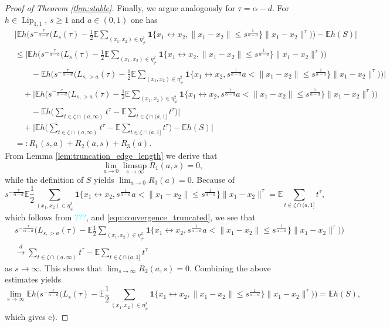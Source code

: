\documentclass{article}
\theoremstyle{definition}
\numberwithin{equation}{section}
\theoremstyle{remark}
\begin{document}
\begin{proof}[Proof of Theorem \ref{thm:stable}]
Finally, we argue analogously for $\tau=\alpha-d$. For $h\in\operatorname{Lip}_{1,1}$, $s\geq 1$ and $a\in(0,1)$ one has
\begin{align*}
& \bigg| \mathbb{E} h\bigg(s^{-\frac{\tau}{\alpha-d}}\bigg(L_s(\tau)-\frac{1}{2}\mathbb{E}\sum_{(x_1,x_2)\in\eta^2_{\neq}} \mathbf{1}\{x_1\leftrightarrow x_2, \|x_1-x_2\|\leq s^{\frac{1}{\alpha-d}}\} \|x_1-x_2\|^\tau\bigg)\bigg)  - \mathbb{E} h(S)\bigg| \\
& \leq \bigg| \mathbb{E} h\bigg(s^{-\frac{\tau}{\alpha-d}}\bigg(L_s(\tau)-\frac{1}{2}\mathbb{E}\sum_{(x_1,x_2)\in\eta^2_{\neq}} \mathbf{1}\{x_1\leftrightarrow x_2, \|x_1-x_2\|\leq s^{\frac{1}{\alpha-d}}\} \|x_1-x_2\|^\tau\bigg)\bigg) \\
& \quad \quad - \mathbb{E} h\bigg(s^{-\frac{\tau}{\alpha-d}}\bigg(L_{s,>a}(\tau)-\frac{1}{2}\mathbb{E}\sum_{(x_1,x_2)\in\eta^2_{\neq}} \mathbf{1}\{x_1\leftrightarrow x_2, s^{\frac{1}{\alpha-d}}a<\|x_1-x_2\|\leq s^{\frac{1}{\alpha-d}}\} \|x_1-x_2\|^\tau\bigg)\bigg) \bigg| \\
& \quad + \bigg| \mathbb{E} h\bigg(s^{-\frac{\tau}{\alpha-d}}\bigg(L_{s,>a}(\tau)-\frac{1}{2}\mathbb{E}\sum_{(x_1,x_2)\in\eta^2_{\neq}} \mathbf{1}\{x_1\leftrightarrow x_2, s^{\frac{1}{\alpha-d}}a<\|x_1-x_2\|\leq s^{\frac{1}{\alpha-d}}\} \|x_1-x_2\|^\tau\bigg)\bigg) \\
& \quad \quad - \mathbb{E} h\bigg( \sum_{t\in \zeta\cap(a,\infty)} t^\tau - \mathbb{E} \sum_{t\in \zeta\cap(a,1]} t^\tau \bigg)\bigg| \\
& \quad + \bigg| \mathbb{E} h\bigg( \sum_{t\in \zeta\cap(a,\infty)} t^\tau - \mathbb{E} \sum_{t\in \zeta\cap(a,1]} t^\tau \bigg) -\mathbb{E}h(S) \bigg| \\
& =: R_1(s,a) + R_2(a,s) + R_3(a).
\end{align*}
From Lemma \ref{lem:truncation_edge_length} we derive that
$$
\lim_{a\to 0} \limsup_{s\to\infty} R_1(a,s) = 0,
$$
while the definition of $S$ yields $\lim_{a\to0} R_3(a)=0$. Because of
$$
s^{-\frac{\tau}{\alpha-d}}\mathbb{E}\frac{1}{2}\sum_{(x_1,x_2)\in\eta^2_{\neq}} \mathbf{1}\{x_1\leftrightarrow x_2,s^{\frac{1}{\alpha-d}}a<\|x_1-x_2\|\leq s^{\frac{1}{\alpha-d}}\} \|x_1-x_2\|^\tau = \mathbb{E} \sum_{t\in \zeta\cap(a,1]} t^\tau,
$$
which follows from \textcolor{cyan}{???}, and \eqref{eqn:convergence_truncated}, we see that
\begin{align*}
& s^{-\frac{\tau}{\alpha-d}}\bigg(L_{s,>a}(\tau)-\mathbb{E}\frac{1}{2}\sum_{(x_1,x_2)\in\eta^2_{\neq}} \mathbf{1}\{x_1\leftrightarrow x_2, s^{\frac{1}{\alpha-d}}a<\|x_1-x_2\|\leq s^{\frac{1}{\alpha-d}}\} \|x_1-x_2\|^\tau\bigg)\bigg) \\
& \overset{d}{\longrightarrow} \sum_{t\in \zeta\cap(a,\infty)} t^\tau - \mathbb{E} \sum_{t\in \zeta\cap(a,1]} t^\tau
\end{align*}
as $s\to\infty$. This shows that $\lim_{s\to\infty} R_2(a,s)=0$. Combining the above estimates yields
$$
\lim_{s\to\infty} \mathbb{E} h\bigg(s^{-\frac{\tau}{\alpha-d}}\bigg(L_s(\tau)-\mathbb{E}\frac{1}{2}\sum_{(x_1,x_2)\in\eta^2_{\neq}} \mathbf{1}\{x_1\leftrightarrow x_2, \|x_1-x_2\|\leq s^{\frac{1}{\alpha-d}}\} \|x_1-x_2\|^\tau\bigg)\bigg)  = \mathbb{E} h(S),
$$
which gives c).
\end{proof}
\end{document}
